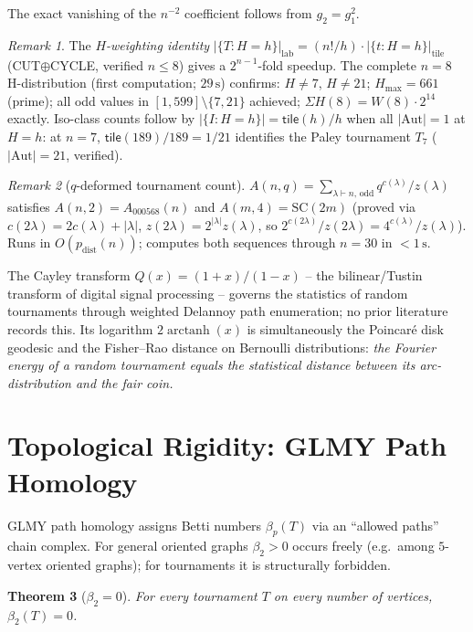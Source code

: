 \documentclass[11pt,reqno]{amsart}
\theoremstyle{plain}
\newtheorem{thm}{Theorem}[section]
\theoremstyle{definition}
\theoremstyle{remark}
\newtheorem{rem}[thm]{Remark}
\begin{document}
The exact vanishing of the $n^{-2}$ coefficient follows from $g_2=g_1^2$.

\begin{rem}
The \emph{$H$-weighting identity} $|\{T: H{=}h\}|_{\text{lab}} = (n!/h)\cdot|\{t: H{=}h\}|_{\text{tile}}$
(CUT$\oplus$CYCLE, verified $n{\le}8$) gives a $2^{n-1}$-fold speedup.
The complete $n{=}8$ H-distribution (first computation; $29\,\mathrm{s}$) confirms:
$H{\ne}7$, $H{\ne}21$; $H_{\max}{=}661$ (prime); all odd values in
$[1,599]\setminus\{7,21\}$ achieved; $\Sigma H(8)=W(8)\cdot 2^{14}$ exactly.
Iso-class counts follow by $|\{I: H{=}h\}|=\mathsf{tile}(h)/h$ when
all $|\mathrm{Aut}|{=}1$ at $H{=}h$: at $n{=}7$, $\mathsf{tile}(189)/189=1/21$
identifies the Paley tournament $T_7$ ($|\mathrm{Aut}|{=}21$, verified).
\end{rem}
\begin{rem}[$q$-deformed tournament count]
$A(n,q)=\!\sum_{\lambda\vdash n,\,\text{odd}}\!q^{c(\lambda)}/z(\lambda)$ satisfies
$A(n,2){=}A_{000568}(n)$ and $A(m,4){=}\mathrm{SC}(2m)$ (proved via
$c(2\lambda){=}2c(\lambda){+}|\lambda|$, $z(2\lambda){=}2^{|\lambda|}z(\lambda)$, so
$2^{c(2\lambda)}/z(2\lambda){=}4^{c(\lambda)}/z(\lambda)$).
Runs in $O(p_\mathrm{dist}(n))$; computes both sequences through $n{=}30$ in ${<}1\,\mathrm{s}$.
\end{rem}

The Cayley transform $Q(x)=(1+x)/(1-x)$ -- the bilinear/Tustin transform
of digital signal processing -- governs the statistics of random tournaments
through weighted Delannoy path enumeration; no prior literature records this.
Its logarithm $2\operatorname{arctanh}(x)$ is simultaneously the Poincar\'e
disk geodesic and the Fisher--Rao distance on Bernoulli distributions:
\emph{the Fourier energy of a random tournament equals the statistical distance
between its arc-distribution and the fair coin.}

\section{Topological Rigidity: GLMY Path Homology}\label{sec:homology}

GLMY path homology \cite{GLMY12} assigns Betti numbers $\beta_p(T)$ via an
``allowed paths'' chain complex.  For general oriented graphs $\beta_2>0$
occurs freely (e.g.\ among $5$-vertex oriented graphs); for tournaments it is
structurally forbidden.

\begin{thm}[$\beta_2=0$]\label{thm:beta2}
For every tournament $T$ on every number of vertices, $\beta_2(T)=0$.
\end{thm}
\end{document}
